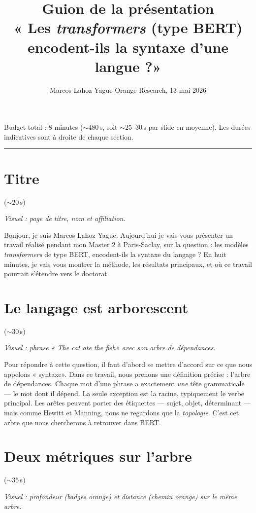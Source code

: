 \documentclass[11pt]{article}
\title{\Large Guion de la présentation\\[0.3em]
       \large\textcolor{midgray}{« Les \emph{transformers} (type BERT)
       encodent-ils la syntaxe d'une langue ?»}}
\author{Marcos Lahoz Yague \textemdash{} Orange Research, 13 mai 2026}
\date{}
\newcommand{\visuel}[1]{%
  {\footnotesize\color{midgray}\textit{Visuel : #1}\par\vspace{0.3em}}}
\newcommand{\duree}[1]{\hfill{\footnotesize\color{midgray}(${\sim}#1$\,s)}}
\begin{document}
\maketitle

\noindent\textcolor{midgray}{\footnotesize Budget total : 8 minutes
(${\sim}480$\,s, soit ${\sim}25$--$30$\,s par slide en moyenne).
Les durées indicatives sont à droite de chaque section.}

\hrule
\vspace{0.6em}

\section{Titre} \duree{20}
\visuel{page de titre, nom et affiliation.}

Bonjour, je suis Marcos Lahoz Yague. Aujourd'hui je vais vous présenter
un travail réalisé pendant mon Master 2 à Paris-Saclay, sur la
question : les modèles \emph{transformers} de type BERT,
encodent-ils la syntaxe du langage ? En huit minutes, je vais vous
montrer la méthode, les résultats principaux, et où ce travail
pourrait s'étendre vers le doctorat.

\section{Le langage est arborescent} \duree{30}
\visuel{phrase « The cat ate the fish» avec son arbre de
        dépendances.}

Pour répondre à cette question, il faut d'abord se mettre d'accord sur
ce que nous appelons « syntaxe». Dans ce travail, nous prenons
une définition précise : l'arbre de dépendances. Chaque mot d'une
phrase a exactement \emph{une} tête grammaticale --- le mot dont il
dépend. La seule exception est la racine, typiquement le verbe
principal. Les arêtes peuvent porter des étiquettes --- sujet, objet,
déterminant --- mais comme Hewitt et Manning, nous ne regardons que
la \emph{topologie}. C'est cet arbre que nous chercherons à retrouver
dans BERT.

\section{Deux métriques sur l'arbre} \duree{35}
\visuel{profondeur (badges orange) et distance (chemin orange) sur le
        même arbre.}
\end{document}

